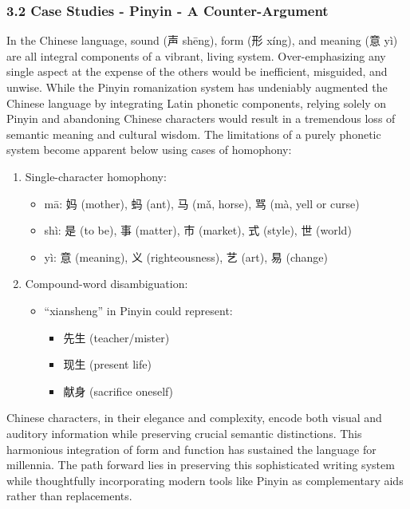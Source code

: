\hypertarget{case-studies---pinyin---a-counter-argument}{%
\subsubsection{3.2 Case Studies - Pinyin - A
Counter-Argument}\label{case-studies---pinyin---a-counter-argument}}

In the Chinese language, sound (声 shēng), form (形 xíng), and meaning
(意 yì) are all integral components of a vibrant, living system.
Over-emphasizing any single aspect at the expense of the others would be
inefficient, misguided, and unwise. While the Pinyin romanization system
has undeniably augmented the Chinese language by integrating Latin
phonetic components, relying solely on Pinyin and abandoning Chinese
characters would result in a tremendous loss of semantic meaning and
cultural wisdom. The limitations of a purely phonetic system become
apparent below using cases of homophony:

\begin{enumerate}
\def\labelenumi{\arabic{enumi}.}
\tightlist
\item
  Single-character homophony:

  \begin{itemize}
  \tightlist
  \item
    mā: 妈 (mother), 蚂 (ant), 马 (mǎ, horse), 骂 (mà, yell or curse)
  \item
    shì: 是 (to be), 事 (matter), 市 (market), 式 (style), 世 (world)
  \item
    yì: 意 (meaning), 义 (righteousness), 艺 (art), 易 (change)
  \end{itemize}
\item
  Compound-word disambiguation:

  \begin{itemize}
  \tightlist
  \item
    ``xiansheng'' in Pinyin could represent:

    \begin{itemize}
    \tightlist
    \item
      先生 (teacher/mister)
    \item
      现生 (present life)
    \item
      献身 (sacrifice oneself)
    \end{itemize}
  \end{itemize}
\end{enumerate}

Chinese characters, in their elegance and complexity, encode both visual
and auditory information while preserving crucial semantic distinctions.
This harmonious integration of form and function has sustained the
language for millennia. The path forward lies in preserving this
sophisticated writing system while thoughtfully incorporating modern
tools like Pinyin as complementary aids rather than replacements.

